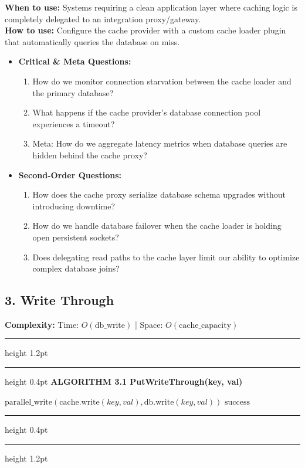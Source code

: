 \documentclass[11pt,a4paper]{article}
\newenvironment{textbookalgo}[2]{%
  \par\addvspace{1.2em}\noindent
  \hrule height 1.2pt
  \vspace{1.5pt}
  \hrule height 0.4pt
  \vspace{5pt}
  {\noindent\large\bfseries\sffamily ALGORITHM #1 \quad #2}
  \par\vspace{5pt}
  \RestyleAlgo{plain}
}{%
  \par\vspace{4pt}
  \hrule height 0.4pt
  \vspace{1.5pt}
  \hrule height 1.2pt
  \par\addvspace{1.2em}
}
\theoremstyle{definition}
\begin{document}
\noindent
\textbf{When to use:} Systems requiring a clean application layer where caching logic is completely delegated to an integration proxy/gateway.\\
\textbf{How to use:} Configure the cache provider with a custom cache loader plugin that automatically queries the database on miss.
\begin{itemize}[leftmargin=*]
  \item[] \textbf{Critical \& Meta Questions:}
  \begin{enumerate}
  \item How do we monitor connection starvation between the cache loader and the primary database?
  \item What happens if the cache provider's database connection pool experiences a timeout?
  \item Meta: How do we aggregate latency metrics when database queries are hidden behind the cache proxy?
  \end{enumerate}
  \item[] \textbf{Second-Order Questions:}
  \begin{enumerate}
  \item How does the cache proxy serialize database schema upgrades without introducing downtime?
  \item How do we handle database failover when the cache loader is holding open persistent sockets?
  \item Does delegating read paths to the cache layer limit our ability to optimize complex database joins?
  \end{enumerate}
\end{itemize}
\medskip

\clearpage
\subsection{3. Write Through}

\noindent
\textbf{Complexity:} Time: $O(\text{db\_write})$ | Space: $O(\text{cache\_capacity})$
\smallskip

\begin{textbookalgo}{3.1}{PutWriteThrough(key, val)}
\begin{algorithm}[H]
$\text{parallel\_write}(\text{cache.write}(key, val), \text{db.write}(key, val))$\;
\Return $\text{success}$\;
\end{algorithm}
\end{textbookalgo}
\end{document}
